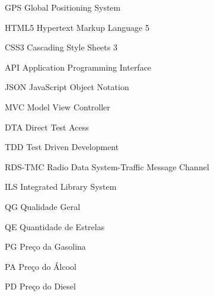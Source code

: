 \begin{siglas}
  \item[GPS] Global Positioning System
  \item[HTML5] Hypertext Markup Language 5
  \item[CSS3] Cascading Style Sheets 3
  \item[API] Application Programming Interface
  \item[JSON] JavaScript Object Notation
  \item[MVC] Model View Controller
  \item[DTA] Direct Test Acess
  \item[TDD] Test Driven Development
  \item[RDS-TMC] Radio Data System-Traffic Message Channel
  \item[ILS] Integrated Library System
  \item[QG] Qualidade Geral
  \item[QE] Quantidade de Estrelas
  \item[PG]	Preço da Gasolina
  \item[PA] Preço do Álcool
  \item[PD] Preço do Diesel
\end{siglas}
